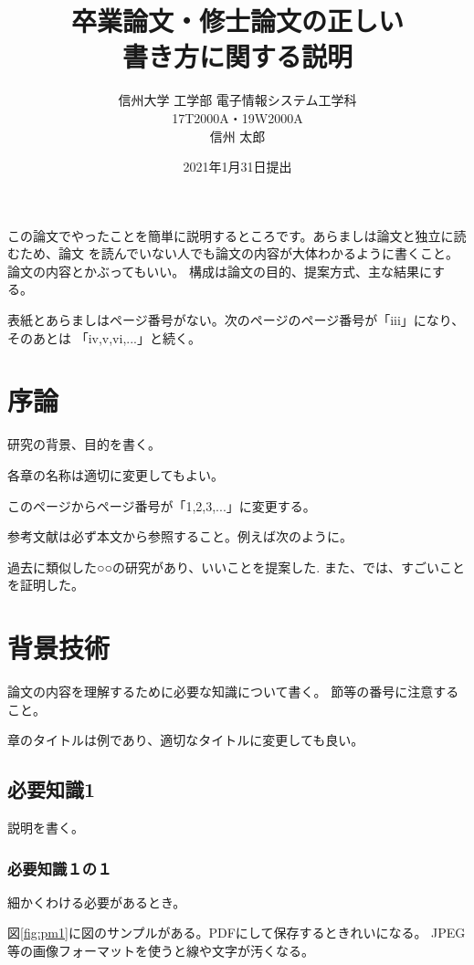 \documentclass[12pt]{jreport}
\title{
\bf 卒業論文・修士論文の正しい\\
書き方に関する説明
}
\date{
2021年1月31日提出
}
\author{
信州大学 工学部 電子情報システム工学科 \\     
17T2000A・19W2000A \\
信州 太郎 \\
}
\begin{document}
\maketitle
\maegaki

\begin{jabstract}
    この論文でやったことを簡単に説明するところです。あらましは論文と独立に読むため、論文
    を読んでいない人でも論文の内容が大体わかるように書くこと。論文の内容とかぶってもいい。
    構成は論文の目的、提案方式、主な結果にする。

    表紙とあらましはページ番号がない。次のページのページ番号が「iii」になり、そのあとは
    「iv,v,vi,...」と続く。
\end{jabstract}

\maetsuke
\tableofcontents
\listoffigures
\listoftables

\hombun

\chapter{序論}
研究の背景、目的を書く。

各章の名称は適切に変更してもよい。

このページからページ番号が「1,2,3,...」に変更する。

参考文献は必ず本文から参照すること。例えば次のように。

過去に類似した○○の研究があり、いいことを提案した\cite{ref1}\cite{ref2}.
また、\cite{ref3}では、すごいことを証明した。

\chapter{背景技術}
論文の内容を理解するために必要な知識について書く。
節等の番号に注意すること。

章のタイトルは例であり、適切なタイトルに変更しても良い。

\section{必要知識1}
説明を書く。

\subsection{必要知識１の１}
細かくわける必要があるとき。

図\ref{fig:pm1}に図のサンプルがある。PDFにして保存するときれいになる。
JPEG等の画像フォーマットを使うと線や文字が汚くなる。
\end{document}
